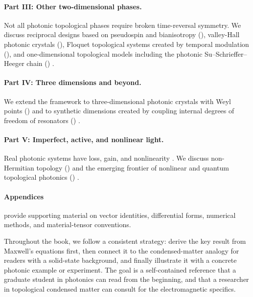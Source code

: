 \paragraph{Part III: Other two-dimensional phases.}
Not all photonic topological phases require broken time-reversal
symmetry.  We discuss reciprocal designs based on pseudospin and
bianisotropy (), valley-Hall photonic
crystals (), Floquet topological systems created by
temporal modulation (), and one-dimensional
topological models including the photonic Su--Schrieffer--Heeger chain
()
\cite{yang2020photonic}.

\paragraph{Part IV: Three dimensions and beyond.}
We extend the framework to three-dimensional photonic crystals with Weyl
points () and to synthetic dimensions created by
coupling internal degrees of freedom of resonators
() \cite{mancini2015observation}.

\paragraph{Part V: Imperfect, active, and nonlinear light.}
Real photonic systems have loss, gain, and nonlinearity \cite{szameit2020nonlinearity}.  We discuss
non-Hermitian topology () and the emerging
frontier of nonlinear and quantum topological photonics
()
\cite{kawabata2019symmetry}.

\paragraph{Appendices} provide supporting material on vector identities,
differential forms, numerical methods, and material-tensor conventions.

\bigskip
Throughout the book, we follow a consistent strategy: derive the key
result from Maxwell's equations first, then connect it to the
condensed-matter analogy for readers with a solid-state background, and
finally illustrate it with a concrete photonic example or experiment.
The goal is a self-contained reference that a graduate student in
photonics can read from the beginning, and that a researcher in
topological condensed matter can consult for the electromagnetic
specifics.


